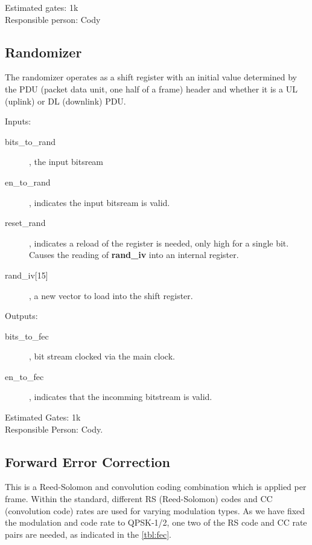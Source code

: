 \documentclass[10pt,twocolumn]{article}
\begin{document}
	Estimated gates: 1k \\
	Responsible person: Cody

	\subsection{Randomizer}
	\label{sec:rand}
	The randomizer operates as a shift register with an initial value
	determined by the PDU (packet data unit, one half of a frame) header
	and whether it is a UL (uplink) or DL (downlink) PDU.

	\begin{description}
		\item{Inputs:}
		\begin{description}
			\item[bits\_to\_rand], the input bitsream
			\item[en\_to\_rand], indicates the input bitsream
				is valid.
			\item[reset\_rand], indicates a reload of the
				register is needed, only high for a single
				bit. Causes the reading of \textbf{rand\_iv}
				into an internal register.
			\item[rand\_iv{[15]}], a new vector to load into
				the shift register.
		\end{description}
		\item{Outputs:}
		\begin{description}
			\item[bits\_to\_fec], bit stream clocked via the
				main clock.
			\item[en\_to\_fec], indicates that the incomming
				bitstream is valid.
		\end{description}
	\end{description}

	Estimated Gates: 1k \\
	Responsible Person: Cody.

	\subsection{Forward Error Correction}
		\label{sec:fec}
		This is a Reed-Solomon and convolution coding combination
		which is applied per frame. Within the standard, different
		RS (Reed-Solomon) codes and CC (convolution code) rates are
		used for varying modulation types. As we have fixed the
		modulation and code rate to QPSK-1/2, one two of the RS
		code and CC rate pairs are needed, as indicated in the
		\autoref{tbl:fec}.
		
\end{document}
